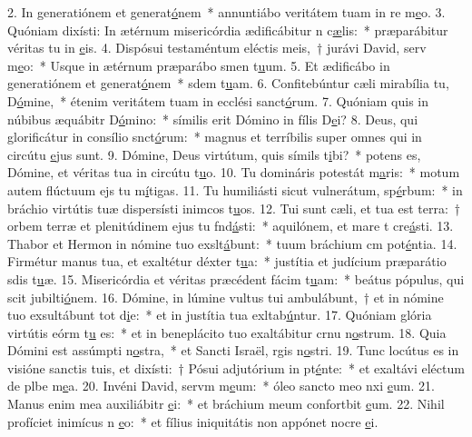 2. In generatiónem et generat\uline{ó}nem~* annuntiábo veritátem tuam in re m\uline{e}o.
3. Quóniam dixísti: In ætérnum misericórdia ædificábitur n c\uline{æ}lis:~* præparábitur véritas tu in \uline{e}is.
4. Dispósui testaméntum eléctis meis,~† jurávi David, serv m\uline{e}o:~* Usque in ætérnum præparábo smen t\uline{u}um.
5. Et ædificábo in generatiónem et generat\uline{ó}nem~* sdem t\uline{u}am.
6. Confitebúntur cæli mirabília tu, D\uline{ó}mine,~* étenim veritátem tuam in ecclési sanct\uline{ó}rum.
7. Quóniam quis in núbibus æquábitr D\uline{ó}mino:~* símilis erit Dómino in fílis D\uline{e}i?
8. Deus, qui glorificátur in consílio snct\uline{ó}rum:~* magnus et terríbilis super omnes qui in circútu \uline{e}jus sunt.
9. Dómine, Deus virtútum, quis símils t\uline{i}bi?~* potens es, Dómine, et véritas tua in circútu t\uline{u}o.
10. Tu domináris potestát m\uline{a}ris:~* motum autem flúctuum ejs tu m\uline{í}tigas.
11. Tu humiliásti sicut vulnerátum, sp\uline{é}rbum:~* in bráchio virtútis tuæ dispersísti inimcos t\uline{u}os.
12. Tui sunt cæli, et tua est terra:~† orbem terræ et plenitúdinem ejus tu fnd\uline{á}sti:~* aquilónem, et mare t cre\uline{á}sti.
13. Thabor et Hermon in nómine tuo exslt\uline{á}bunt:~* tuum bráchium cm pot\uline{é}ntia.
14. Firmétur manus tua, et exaltétur déxter t\uline{u}a:~* justítia et judícium præparátio sdis t\uline{u}æ.
15. Misericórdia et véritas præcédent fácim t\uline{u}am:~* beátus pópulus, qui scit jubilti\uline{ó}nem.
16. Dómine, in lúmine vultus tui ambulábunt,~† et in nómine tuo exsultábunt tot d\uline{i}e:~* et in justítia tua exltab\uline{ú}ntur.
17. Quóniam glória virtútis eórm t\uline{u} es:~* et in beneplácito tuo exaltábitur crnu n\uline{o}strum.
18. Quia Dómini est assúmpti n\uline{o}stra,~* et Sancti Israël, rgis n\uline{o}stri.
19. Tunc locútus es in visióne sanctis tuis, et dixísti:~† Pósui adjutórium in pt\uline{é}nte:~* et exaltávi eléctum de plbe m\uline{e}a.
20. Invéni David, servm m\uline{e}um:~* óleo sancto meo nxi \uline{e}um.
21. Manus enim mea auxiliábitr \uline{e}i:~* et bráchium meum confortbit \uline{e}um.
22. Nihil profíciet inimícus n \uline{e}o:~* et fílius iniquitátis non appónet nocre \uline{e}i.
